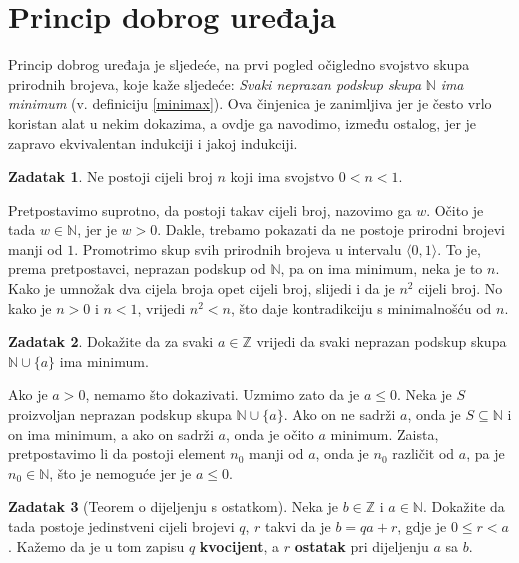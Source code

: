 \documentclass{book}
\renewenvironment{proof}{%
    \vspace{-\parskip}\begin{oldproof}%
    }{%
    \end{oldproof}%
}
\theoremstyle{definition}
\theoremstyle{definition}
\newtheorem{exercise}{Zadatak}
\theoremstyle{remark}
\begin{document}
\section{Princip dobrog uređaja}
Princip dobrog uređaja je sljedeće, na prvi pogled očigledno svojstvo skupa prirodnih brojeva, koje kaže sljedeće: \textit{Svaki neprazan podskup skupa} $\mathbb{N}$ \textit{ima minimum} (v. definiciju \ref{minimax}). Ova činjenica je zanimljiva jer je često vrlo koristan alat u nekim dokazima, a ovdje ga navodimo, između ostalog, jer je zapravo ekvivalentan indukciji i jakoj indukciji.
\begin{exercise}
\label{23}
Ne postoji cijeli broj $n$ koji ima svojstvo $0<n<1$.
\end{exercise}
\begin{proof}[Rješenje]
Pretpostavimo suprotno, da postoji takav cijeli broj, nazovimo ga $w$. Očito je tada $w\in \mathbb{N}$, jer je $w>0$. Dakle, trebamo pokazati da ne postoje prirodni brojevi manji od $1$. Promotrimo skup svih prirodnih brojeva u intervalu $\langle 0, 1\rangle$. To je, prema pretpostavci, neprazan podskup od $\mathbb{N}$, pa on ima minimum, neka je to $n$. Kako je umnožak dva cijela broja opet cijeli broj, slijedi i da je $n^2$ cijeli broj. No kako je $n>0$ i $n<1$, vrijedi $n^2<n$, što daje kontradikciju s minimalnošću od $n$.
\end{proof}
\begin{exercise}
\label{24}
Dokažite da za svaki $a\in \mathbb{Z}$ vrijedi da svaki neprazan podskup skupa $\mathbb{N}\cup\{a\}$ ima minimum.
\end{exercise}
\begin{proof}[Rješenje]
Ako je $a>0$, nemamo što dokazivati. Uzmimo zato da je $a\leq 0$. Neka je $S$ proizvoljan neprazan podskup skupa $\mathbb{N}\cup\{a\}$. Ako on ne sadrži $a$, onda je $S\subseteq \mathbb{N}$ i on ima minimum, a ako on sadrži $a$, onda je očito $a$ minimum. Zaista, pretpostavimo li da postoji element $n_0$ manji od $a$, onda je $n_0$ različit od $a$, pa je $n_0\in \mathbb{N}$, što je nemoguće jer je $a\leq 0$.
\end{proof}
\begin{exercise}[Teorem o dijeljenju s ostatkom]
Neka je $b\in \mathbb{Z}$ i $a\in \mathbb{N}$. Dokažite da tada postoje jedinstveni cijeli brojevi $q$, $r$ takvi da je $b=qa+r$, gdje je $0\leq r<a$. Kažemo da je u tom zapisu $q$ \textbf{kvocijent}, a $r$ \textbf{ostatak} pri dijeljenju $a$ sa $b$.
\end{exercise}
\end{document}
